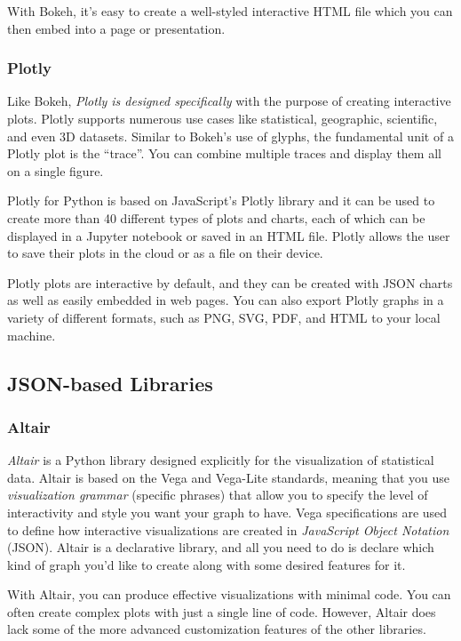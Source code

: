 \documentclass[11pt]{article}
\begin{document}
With Bokeh, it's easy to create a well-styled interactive HTML file
which you can then embed into a page or presentation.

\subsubsection{Plotly}\label{plotly}

Like Bokeh, \emph{Plotly is designed specifically} with the purpose of
creating interactive plots. Plotly supports numerous use cases like
statistical, geographic, scientific, and even 3D datasets. Similar to
Bokeh's use of glyphs, the fundamental unit of a Plotly plot is the
``trace''. You can combine multiple traces and display them all on a
single figure.

Plotly for Python is based on JavaScript's Plotly library and it can be
used to create more than 40 different types of plots and charts, each of
which can be displayed in a Jupyter notebook or saved in an HTML file.
Plotly allows the user to save their plots in the cloud or as a file on
their device.

Plotly plots are interactive by default, and they can be created with
JSON charts as well as easily embedded in web pages. You can also export
Plotly graphs in a variety of different formats, such as PNG, SVG, PDF,
and HTML to your local machine.

\subsection{JSON-based Libraries}\label{json-based-libraries-1}

\subsubsection{Altair}\label{altair}

\emph{Altair} is a Python library designed explicitly for the
visualization of statistical data. Altair is based on the Vega and
Vega-Lite standards, meaning that you use \emph{visualization grammar}
(specific phrases) that allow you to specify the level of interactivity
and style you want your graph to have. Vega specifications are used to
define how interactive visualizations are created in \emph{JavaScript
Object Notation} (JSON). Altair is a declarative library, and all you
need to do is declare which kind of graph you'd like to create along
with some desired features for it.

With Altair, you can produce effective visualizations with minimal code.
You can often create complex plots with just a single line of code.
However, Altair does lack some of the more advanced customization
features of the other libraries.
\end{document}
